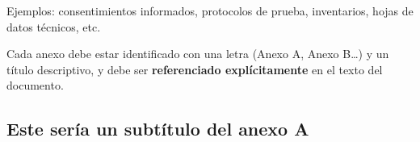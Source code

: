 \documentclass[11pt]{article}
\begin{document}
\par \vspace{12pt}

Ejemplos: consentimientos informados, protocolos de prueba, inventarios, hojas de datos técnicos, etc.
\par \vspace{12pt}

Cada anexo debe estar identificado con una letra (Anexo A, Anexo B…) y un título descriptivo, y debe ser \textbf{referenciado explícitamente} en el texto del documento.

\subsection{Este sería un subtítulo del anexo A}
\end{document}
